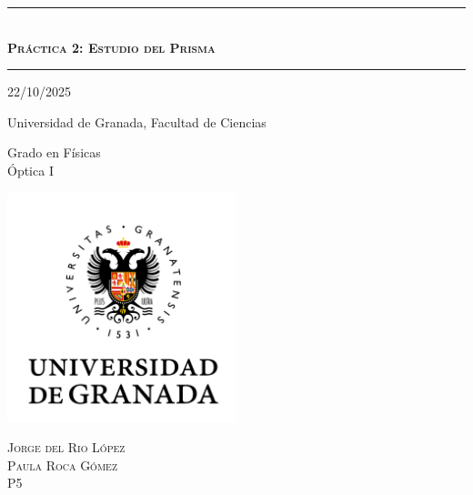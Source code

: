 \documentclass[10pt,onecolumn]{article}
\begin{document}
\renewcommand{\headrulewidth}{0.5pt}
\newcommand{\HRule}[1]{\rule{\linewidth}{#1}}
\renewcommand{\refname}{Bibliografía}
\renewcommand{\tablename}{Tabla}
\renewcommand{\contentsname}{Índice}
\renewcommand{\figurename}{Figura}

\onecolumn
\begin{titlepage}
\centering
    {\HRule{2 pt}} \\
    \vspace{0.5cm}
    {\scshape\Huge {\textbf{Práctica 2: Estudio del Prisma}  }}  \\
    \vspace{1 mm}
    
    {\HRule{2 pt}}

    \vspace{1cm}
    \Large 22/10/2025 \\
    \vspace{1cm}
 
    \normalfont\Large Universidad de Granada, Facultad de Ciencias \\
    \vspace{0.5cm}
    
    
     \normalfont\Large Grado en Físicas \\
    \vspace{0.5cm}
    \normalfont Óptica I\\%
    \vspace{1.5cm}

\centering
    {\includegraphics[width=0.5\textwidth]{UGR-MARCA-01-color.jpg}\par}

\vfill
    \vspace{1cm}
    \scshape\Large Jorge del Rio López \\
    \scshape\Large Paula Roca Gómez\\

    \vspace{0.5cm}
    \scshape\Large P5

\vfill

\end{titlepage}
\end{document}
